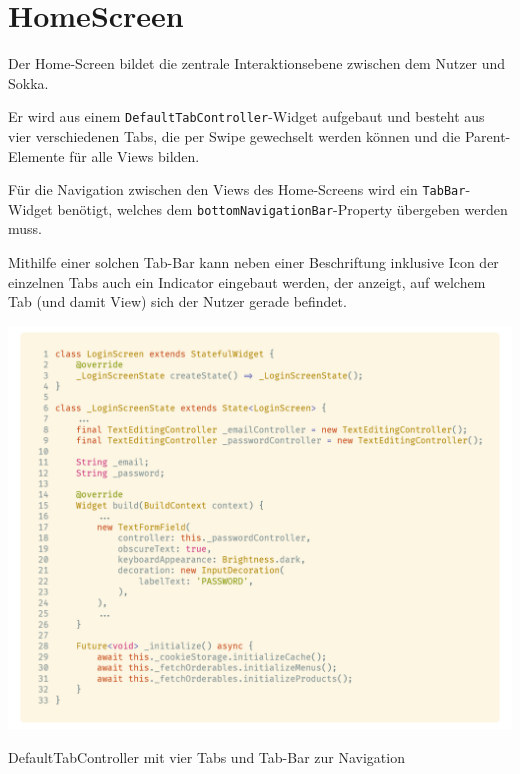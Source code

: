 \section{HomeScreen}

Der Home-Screen bildet die zentrale Interaktionsebene zwischen dem Nutzer und Sokka.

Er wird aus einem \lstinline{DefaultTabController}-Widget aufgebaut und besteht aus vier
verschiedenen Tabs, die per Swipe gewechselt werden können und die Parent-Elemente
für alle Views bilden.

Für die Navigation zwischen den Views des Home-Screens wird ein \lstinline{TabBar}-Widget
benötigt, welches dem \lstinline{bottomNavigationBar}-Property übergeben werden muss.

Mithilfe einer solchen Tab-Bar kann neben einer Beschriftung inklusive Icon
der einzelnen Tabs auch ein Indicator eingebaut werden, der anzeigt, auf welchem Tab (und damit View)
sich der Nutzer gerade befindet.

\begin{code}[H]
    \centering
    \includegraphics[width=1\textwidth]{images/Client/screens/home/tabbar.png}
    \caption{DefaultTabController mit vier Tabs und Tab-Bar zur Navigation}
\end{code}